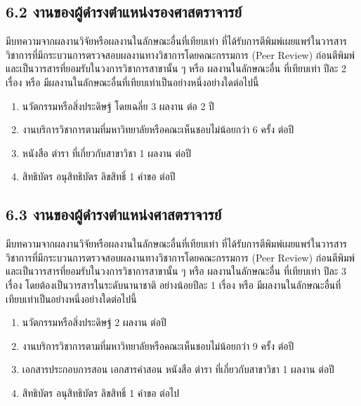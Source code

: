 \documentclass[a4paper,12pt,english]{sphinxmanual}
\begin{document}
\subsection{6.2 งานของผู้ดำรงตำแหน่งรองศาสตราจารย์}
\label{\detokenize{workload_rubric:id102}}
มีบทความจากผลงานวิจัยหรือผลงานในลักษณะอื่นที่เทียบเท่า ที่ได้รับการตีพิมพ์เผยแพร่ในวารสารวิชาการที่มีกระบวนการตรวจสอบผลงานทางวิชาการโดยคณะกรรมการ (Peer Review) ก่อนตีพิมพ์ และเป็นวารสารที่ยอมรับในวงการวิชาการสาขานั้น ๆ หรือ ผลงานในลักษณะอื่น ที่เทียบเท่า ปีละ 2 เรื่อง หรือ มีผลงานในลักษณะอื่นที่เทียบเท่าเป็นอย่างหนึ่งอย่างใดต่อไปนี้
\begin{enumerate}
%
\item {} 
นวัตกรรมหรือสิ่งประดิษฐ์ โดยเฉลี่ย 3 ผลงาน ต่อ 2 ปี

\item {} 
งานบริการวิชาการตามที่มหาวิทยาลัยหรือคณะเห็นชอบไม่น้อยกว่า 6 ครั้ง ต่อปี

\item {} 
หนังสือ ตำรา ที่เกี่ยวกับสาขาวิชา 1 ผลงาน ต่อปี

\item {} 
สิทธิบัตร อนุสิทธิบัตร ลิขสิทธิ์ 1 คำขอ ต่อปี

\end{enumerate}


\subsection{6.3 งานของผู้ดำรงตำแหน่งศาสตราจารย์}
\label{\detokenize{workload_rubric:id103}}
มีบทความจากผลงานวิจัยหรือผลงานในลักษณะอื่นที่เทียบเท่า ที่ได้รับการตีพิมพ์เผยแพร่ในวารสารวิชาการที่มีกระบวนการตรวจสอบผลงานทางวิชาการโดยคณะกรรมการ (Peer Review) ก่อนตีพิมพ์ และเป็นวารสารที่ยอมรับในวงการวิชาการสาขานั้น ๆ หรือ ผลงานในลักษณะอื่น ที่เทียบเท่า ปีละ 3 เรื่อง โดยต้องเป็นวารสารในระดับนานาชาติ อย่างน้อยปีละ 1 เรื่อง หรือ มีผลงานในลักษณะอื่นที่เทียบเท่าเป็นอย่างหนึ่งอย่างใดต่อไปนี้
\begin{enumerate}
%
\item {} 
นวัตกรรมหรือสิ่งประดิษฐ์ 2 ผลงาน ต่อปี

\item {} 
งานบริการวิชาการตามที่มหาวิทยาลัยหรือคณะเห็นชอบไม่น้อยกว่า 9 ครั้ง ต่อปี

\item {} 
เอกสารประกอบการสอน เอกสารคำสอน หนังสือ ตำรา ที่เกี่ยวกับสาขาวิชา 1 ผลงาน ต่อปี

\item {} 
สิทธิบัตร อนุสิทธิบัตร ลิขสิทธิ์ 1 คำขอ ต่อไป

\end{enumerate}
\end{document}
